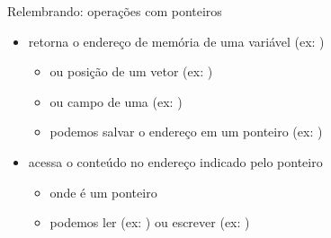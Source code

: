 \documentclass{beamer}
\begin{document}
\begin{frame}[<+->]{Relembrando: operações com ponteiros}
  \begin{itemize}
    \item \alert{\cod{\&}} retorna o endereço de memória de uma variável (ex: )
      \begin{itemize}
        \item ou posição de um vetor (ex: )
        \item ou campo de uma  (ex: )
        \item podemos salvar o endereço em um ponteiro (ex: )
      \end{itemize}
    \item \alert{\cod{*}} acessa o conteúdo no endereço indicado pelo ponteiro
      \begin{itemize}
        \item {} onde  é um ponteiro
        \item podemos ler (ex: ) ou escrever (ex: )
      \end{itemize}
  \end{itemize}

  \bigskip

  \begin{columns}
    \begin{column}{0.6\linewidth}
      
    \end{column}
    \begin{column}{0.4\linewidth}
      \centering
    \end{column}
  \end{columns}
\end{frame}
\end{document}
